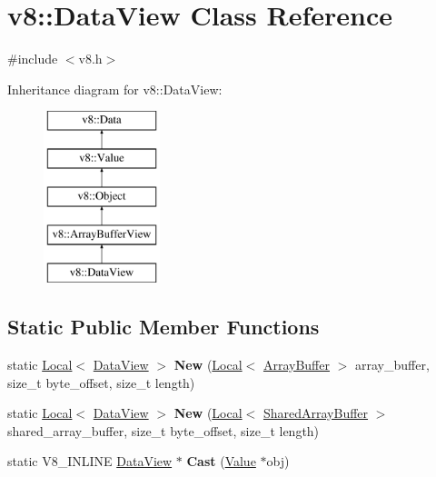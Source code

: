 \hypertarget{classv8_1_1DataView}{}\section{v8\+:\+:Data\+View Class Reference}
\label{classv8_1_1DataView}


{\ttfamily \#include $<$v8.\+h$>$}

Inheritance diagram for v8\+:\+:Data\+View\+:\begin{figure}[H]
\begin{center}
\leavevmode
\includegraphics[height=5.000000cm]{classv8_1_1DataView}
\end{center}
\end{figure}
\subsection*{Static Public Member Functions}
\begin{DoxyCompactItemize}
\item 
\mbox{\label{classv8_1_1DataView_a40dcfc9ed56dbc41f48ddc49271cbab0}} 
static \mbox{\hyperlink{classv8_1_1Local}{Local}}$<$ \mbox{\hyperlink{classv8_1_1DataView}{Data\+View}} $>$ {\bfseries New} (\mbox{\hyperlink{classv8_1_1Local}{Local}}$<$ \mbox{\hyperlink{classv8_1_1ArrayBuffer}{Array\+Buffer}} $>$ array\+\_\+buffer, size\+\_\+t byte\+\_\+offset, size\+\_\+t length)
\item 
\mbox{\label{classv8_1_1DataView_a8310e075564dd9f26122be2733995ba2}} 
static \mbox{\hyperlink{classv8_1_1Local}{Local}}$<$ \mbox{\hyperlink{classv8_1_1DataView}{Data\+View}} $>$ {\bfseries New} (\mbox{\hyperlink{classv8_1_1Local}{Local}}$<$ \mbox{\hyperlink{classv8_1_1SharedArrayBuffer}{Shared\+Array\+Buffer}} $>$ shared\+\_\+array\+\_\+buffer, size\+\_\+t byte\+\_\+offset, size\+\_\+t length)
\item 
\mbox{\label{classv8_1_1DataView_aa97d15fcb28c6c002a52d32877c8fd3a}} 
static V8\+\_\+\+I\+N\+L\+I\+NE \mbox{\hyperlink{classv8_1_1DataView}{Data\+View}} $\ast$ {\bfseries Cast} (\mbox{\hyperlink{classv8_1_1Value}{Value}} $\ast$obj)
\end{DoxyCompactItemize}
